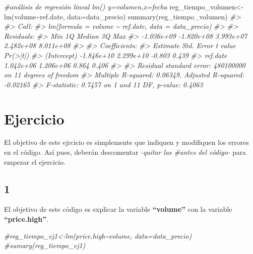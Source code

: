 \documentclass[
]{book}
\newenvironment{Shaded}{\begin{snugshade}}{\end{snugshade}}
\newcommand{\AttributeTok}[1]{\textcolor[rgb]{0.77,0.63,0.00}{#1}}
\newcommand{\CommentTok}[1]{\textcolor[rgb]{0.56,0.35,0.01}{\textit{#1}}}
\newcommand{\FunctionTok}[1]{\textcolor[rgb]{0.00,0.00,0.00}{#1}}
\newcommand{\NormalTok}[1]{#1}
\newcommand{\OtherTok}[1]{\textcolor[rgb]{0.56,0.35,0.01}{#1}}
\newcommand{\SpecialCharTok}[1]{\textcolor[rgb]{0.00,0.00,0.00}{#1}}
\begin{document}
\begin{Shaded}
\begin{Highlighting}[]
\CommentTok{\#análisis de regresión lineal lm() y=volumen,x=fecha}
\NormalTok{reg\_tiempo\_volumen}\OtherTok{\textless{}{-}}\FunctionTok{lm}\NormalTok{(volume}\SpecialCharTok{\textasciitilde{}}\NormalTok{ref.date, }\AttributeTok{data=}\NormalTok{data\_precio)}
\FunctionTok{summary}\NormalTok{(reg\_tiempo\_volumen)}
\CommentTok{\#\textgreater{} }
\CommentTok{\#\textgreater{} Call:}
\CommentTok{\#\textgreater{} lm(formula = volume \textasciitilde{} ref.date, data = data\_precio)}
\CommentTok{\#\textgreater{} }
\CommentTok{\#\textgreater{} Residuals:}
\CommentTok{\#\textgreater{}        Min         1Q     Median         3Q        Max }
\CommentTok{\#\textgreater{} {-}1.036e+09 {-}1.820e+08  3.993e+07  2.482e+08  8.011e+08 }
\CommentTok{\#\textgreater{} }
\CommentTok{\#\textgreater{} Coefficients:}
\CommentTok{\#\textgreater{}               Estimate Std. Error t value Pr(\textgreater{}|t|)}
\CommentTok{\#\textgreater{} (Intercept) {-}1.846e+10  2.299e+10  {-}0.803    0.439}
\CommentTok{\#\textgreater{} ref.date     1.042e+06  1.206e+06   0.864    0.406}
\CommentTok{\#\textgreater{} }
\CommentTok{\#\textgreater{} Residual standard error: 480100000 on 11 degrees of freedom}
\CommentTok{\#\textgreater{} Multiple R{-}squared:  0.06349,    Adjusted R{-}squared:  {-}0.02165 }
\CommentTok{\#\textgreater{} F{-}statistic: 0.7457 on 1 and 11 DF,  p{-}value: 0.4063}
\end{Highlighting}
\end{Shaded}

\hypertarget{ejercicio}{%
\section{Ejercicio}\label{ejercicio}}

El objetivo de este ejrcicio es simplemente que indiquen y modifiquen los errores en el código. Así pues, deberán descomentar \emph{-quitar las \#antes del código-} para empezar el ejercicio.

\hypertarget{section}{%
\subsection{1}\label{section}}

El objetivo de este código es explicar la variable \textbf{``volume''} con la variable \textbf{``price.high''}.

\begin{Shaded}
\begin{Highlighting}[]
\CommentTok{\#reg\_tiempo\_ej1\textless{}{-}lm(price.high\textasciitilde{}volume, data=data\_precio)}
\CommentTok{\#sumary(reg\_tiempo\_ej1)}
\end{Highlighting}
\end{Shaded}
\end{document}

